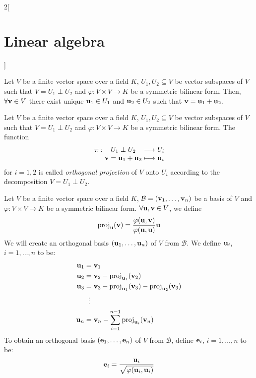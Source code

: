 \documentclass[../../../main.tex]{subfiles}
\begin{document}
\begin{multicols}{2}[\section{Linear algebra}]
\begin{definition}
  \end{definition}
  \begin{proposition}
    Let $V$ be a finite vector space over a field $K$, $U_1,U_2\subseteq V$ be vector subspaces of $V$ such that $V=U_1\perp U_2$ and $\varphi:V\times V\rightarrow K$ be a symmetric bilinear form. Then, $\forall \boldsymbol{\mathrm{v}}\in V$ there exist unique $\boldsymbol{\mathrm{u}}_1\in U_1$ and $\boldsymbol{\mathrm{u}}_2\in U_2$ such that $\boldsymbol{\mathrm{v}}=\boldsymbol{\mathrm{u}}_1+\boldsymbol{\mathrm{u}}_2$.
  \end{proposition}
  \begin{definition}\label{LA_perpendicular}
    Let $V$ be a finite vector space over a field $K$, $U_1,U_2\subseteq V$ be vector subspaces of $V$ such that $V=U_1\perp U_2$ and $\varphi:V\times V\rightarrow K$ be a symmetric bilinear form. The function
    $$\function{\pi}{U_1\perp U_2}{U_i}{\vf{v}=\vf{u}_1+\vf{u}_2}{\vf{u}_i}$$
    for $i=1,2$ is called \emph{orthogonal projection} of $V$ onto $U_i$ according to the decomposition $V=U_1\perp U_2$.
  \end{definition}
  \begin{method}
    Let $V$ be a finite vector space over a field $K$, $\mathcal{B}=(\boldsymbol{\mathrm{v}}_1,\ldots,\boldsymbol{\mathrm{v}}_n)$ be a basis of $V$ and $\varphi:V\times V\rightarrow K$ be a symmetric bilinear form. $\forall\boldsymbol{\mathrm{u}},\boldsymbol{\mathrm{v}}\in V$, we define $$\text{proj}_{\boldsymbol{\mathrm{u}}}(\boldsymbol{\mathrm{v}})=\frac{\varphi(\boldsymbol{\mathrm{u}},\boldsymbol{\mathrm{v}})}{\varphi(\boldsymbol{\mathrm{u}},\boldsymbol{\mathrm{u}})}\boldsymbol{\mathrm{u}}$$ We will create an orthogonal basis $(\boldsymbol{\mathrm{u}}_1,\ldots,\boldsymbol{\mathrm{u}}_n)$ of $V$ from $\mathcal{B}$. We define $\boldsymbol{\mathrm{u}}_i$, $i=1,\ldots,n$ to be:
    \begin{align*}
      \boldsymbol{\mathrm{u}}_1 & =\boldsymbol{\mathrm{v}}_1                                                                   \\
      \boldsymbol{\mathrm{u}}_2 & =\boldsymbol{\mathrm{v}}_2-\text{proj}_{\boldsymbol{\mathrm{u}}_1}(\boldsymbol{\mathrm{v}}_2)                                  \\
      \boldsymbol{\mathrm{u}}_3 & =\boldsymbol{\mathrm{v}}_3-\text{proj}_{\boldsymbol{\mathrm{u}}_1}(\boldsymbol{\mathrm{v}}_3)-\text{proj}_{\boldsymbol{\mathrm{u}}_2}(\boldsymbol{\mathrm{v}}_3) \\
               & \;\;\vdots                                                                  \\
      \boldsymbol{\mathrm{u}}_n & =\boldsymbol{\mathrm{v}}_n-\sum_{i=1}^{n-1}\text{proj}_{\boldsymbol{\mathrm{u}}_i}(\boldsymbol{\mathrm{v}}_n)
    \end{align*}
    To obtain an orthogonal basis $(\boldsymbol{\mathrm{e}}_1,\ldots,\boldsymbol{\mathrm{e}}_n)$ of $V$ from $\mathcal{B}$, define $\boldsymbol{\mathrm{e}}_i$, $i=1,\ldots,n$ to be: $$\boldsymbol{\mathrm{e}}_i=\frac{\boldsymbol{\mathrm{u}}_i}{\sqrt{\varphi(\boldsymbol{\mathrm{u}}_i,\boldsymbol{\mathrm{u}}_i)}}$$
  \end{method}

\end{multicols}
\end{document}
